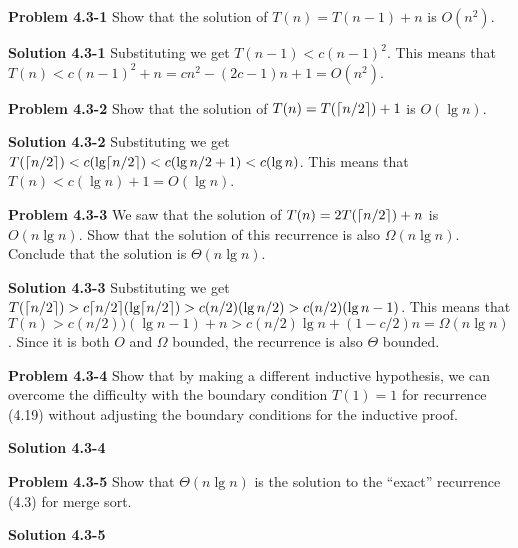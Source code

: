 \documentclass{article}
\DeclarePairedDelimiter\ceil{\lceil}{\rceil}
\begin{document}
\hrulefill

\medskip

\textbf{Problem 4.3-1} Show that the solution of $T(n) = T(n - 1) + n$ is $O(n^2)$.

\medskip

\textbf{Solution 4.3-1} Substituting we get $T(n-1) < c(n-1)^2$. This means that $T(n) < c(n-1)^2 + n = cn^2 - (2c -1)n + 1 = \boxed{O(n^2)}$.

\hrulefill

\medskip

\textbf{Problem 4.3-2} Show that the solution of $T(n) = T(\ceil{n/2}) + 1$ is $O(\lg n)$.

\medskip

\textbf{Solution 4.3-2} Substituting we get $T(\ceil{n/2}) < c(\lg \ceil{n/2}) < c(\lg n/2 + 1) < c(\lg n)$. This means that $T(n) < c(\lg n) + 1 = \boxed{O(\lg n)}$.

\hrulefill

\medskip

\textbf{Problem 4.3-3} We saw that the solution of $T(n) = 2T(\ceil{n/2}) + n$ is $O(n \lg n)$. Show that the solution of this recurrence is also  $\Omega(n \lg n)$. Conclude that the solution is $\Theta(n \lg n)$.

\medskip

\textbf{Solution 4.3-3} Substituting we get $T(\ceil{n/2}) > c\ceil{n/2}(\lg \ceil{n/2}) > c(n/2)(\lg n/2) > c(n/2)(\lg n - 1)$. This means that $T(n) > c(n/2))(\lg n - 1) + n > c(n/2)\lg n + (1 - c/2)n= \boxed{\Omega(n \lg n)}$. Since it is both $O$ and $\Omega$ bounded, the recurrence is also $\Theta$ bounded.

\hrulefill

\medskip

\textbf{Problem 4.3-4} Show that by making a different inductive hypothesis, we can overcome the difficulty with the boundary condition $T(1) = 1$ for recurrence (4.19) without adjusting the boundary conditions for the inductive proof.

\medskip

\textbf{Solution 4.3-4}

\hrulefill

\medskip

\textbf{Problem 4.3-5} Show that $\Theta(n \lg n)$ is the solution to the “exact” recurrence (4.3) for merge sort.

\medskip

\textbf{Solution 4.3-5}

\hrulefill
\end{document}
